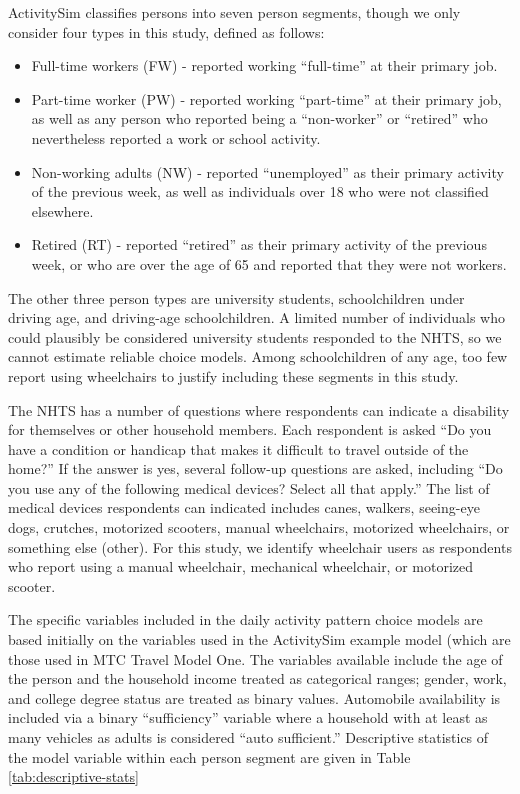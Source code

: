 \documentclass[3p, authoryear, review]{elsarticle} %
\providecommand{\tightlist}{%
  \setlength{\itemsep}{0pt}\setlength{\parskip}{0pt}}
\begin{document}
ActivitySim classifies persons into seven person segments, though we only
consider four types in this study, defined as follows:

\begin{itemize}
\tightlist
\item
  Full-time workers (FW) - reported working ``full-time'' at their primary job.
\item
  Part-time worker (PW) - reported working ``part-time'' at their primary job,
  as well as any person who reported being a ``non-worker'' or ``retired'' who nevertheless
  reported a work or school activity.
\item
  Non-working adults (NW) - reported ``unemployed'' as their primary activity
  of the previous week, as well as individuals over 18 who were not classified
  elsewhere.
\item
  Retired (RT) - reported ``retired'' as their primary activity of the previous
  week, or who are over the age of 65 and reported that they were not workers.
\end{itemize}

The other three person types are university students, schoolchildren under
driving age, and driving-age schoolchildren. A limited number of individuals who
could plausibly be considered university students responded to the NHTS, so we
cannot estimate reliable choice models. Among schoolchildren of any age, too few
report using wheelchairs to justify including these segments in this study.

The NHTS has a number of questions where respondents can indicate a disability
for themselves or other household members. Each respondent is asked ``Do you
have a condition or handicap that makes it difficult to travel outside of the
home?'' If the answer is yes, several follow-up questions are asked, including
``Do you use any of the following medical devices? Select all that apply.'' The
list of medical devices respondents can indicated includes canes, walkers,
seeing-eye dogs, crutches, motorized scooters, manual wheelchairs,
motorized wheelchairs, or something else (other).
For this study, we identify wheelchair users as respondents who report using a
manual wheelchair, mechanical wheelchair, or motorized scooter.

The specific variables included in the daily activity pattern choice models
are based initially on the variables used in the ActivitySim example model (which are
those used in MTC Travel Model One. The variables available include the age of
the person and the household income treated as categorical ranges; gender, work,
and college degree status are treated as binary values. Automobile availability is
included via a binary ``sufficiency'' variable where a household with at least as
many vehicles as adults is considered ``auto sufficient.'' Descriptive statistics
of the model variable within each person segment are given in
Table \ref{tab:descriptive-stats}
\end{document}

